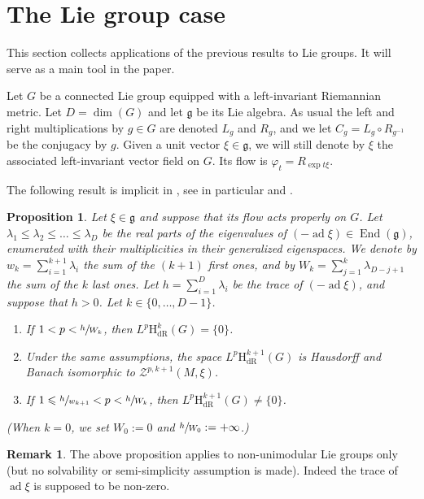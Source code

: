 \documentclass[JEP,XML,SOM,Unicode,published]{cedram}
\newcommand{\dR}{\mathrm{dR}}
\newcommand{\rH}{\mathrm{H}}
\newcommand{\frg}{\mathfrak{g}}
\theoremstyle{plain}
\newtheorem{proposition}[equation]{Proposition}
\theoremstyle{remark}
\theoremstyle{definition}
\newtheorem{remark}[equation]{Remark}
\DeclareMathOperator{\ad}{ad}
\DeclareMathOperator{\End}{End}
\begin{document}
\section{The Lie group case}
\label{s - Lie group dR}

This section collects applications of the previous results to Lie groups.
It will serve as a main tool in the paper.

Let $G$ be a connected Lie group equipped with a left-invariant Riemannian metric. Let $D = \dim(G)$ and let $\mathfrak g$
be its Lie algebra.
As usual the left and right multiplications by $g \in G$ are denoted $L_g$ and $R_g$,
and we let $C_g = L_g \circ R_{g^{-1}}$ be the conjugacy by $g$.
Given a unit vector $\xi \in \mathfrak g$,
we will still denote by $\xi$ the associated left-invariant vector field on $G$.
Its flow is $\varphi_t = R_{\exp t \xi}$.

The following result is implicit in \cite{Pa99}, see in particular \cite[Cor.\,53]{Pa99} and \cite[Prop.\,57]{Pa99}.

\begin{proposition}
\label{lie-proposition}
Let $\xi \in \frg$ and suppose that its flow acts properly on $G$.
Let $\lambda_1 \leqslant \lambda_2 \leqslant \dots \leqslant \lambda_D$
be the real parts of the eigenvalues of $(-\ad\xi) \in \End(\mathfrak g)$,
enumerated with their multiplicities in their generalized eigenspaces. We denote by $w_k = \sum_{i=1}^{k+1} \lambda_i$
the sum of the $(k+1)$ first ones, and by $W_k = \sum_{j=1}^k \lambda_{D-j+1}$
the sum of the $k$ last ones.
Let $h = \sum_{i=1}^D \lambda_i$ be the trace of $(-\ad \xi)$, and suppose that $h>0$. Let $k \in \{0, \dots, D-1\}$.
\begin{enumerate}
\item If $1< p< \sfrac{h}{W_k}$, then $L^p \rH^k_\dR(G) = \{0\}$.
\item Under the same assumptions, the space $L^p \rH^{k+1}_\dR(G)$ is
Hausdorff and Banach isomorphic to $\mathcal Z^{p,k+1}(M, \xi)$.
\item If $1 \leqslant \sfrac{h}{w_{k+1}}<p<\sfrac{h}{W_k}$, then
$L^p \rH^{k+1}_\dR(G) \neq \{0\}$.
\end{enumerate}
(When $k=0$, we set $W_0:=0$ and $\sfrac{h}{W_0}:= +\infty$.)
\end{proposition}

\begin{remark}
The above proposition applies to non-unimodular Lie groups only (but no solvability or semi-simplicity assumption is made).
Indeed the trace of $\ad \xi$ is supposed to be non-zero.
\end{remark}
\end{document}
